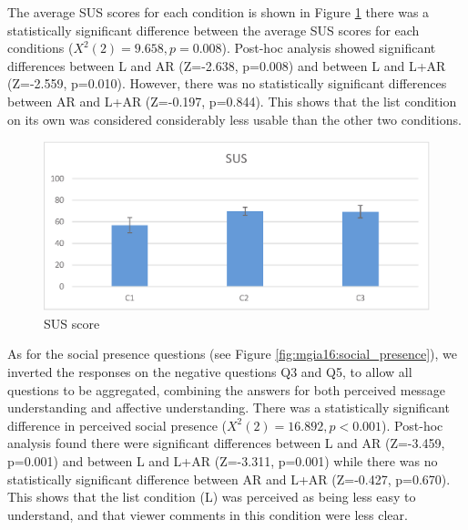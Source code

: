 The average SUS scores for each condition is shown in Figure \ref{fig:mgia16:questions_sus} there was a statistically significant difference between the average SUS scores for each conditions ($X^2(2)=9.658, p=0.008$). Post-hoc analysis showed significant differences between L and AR (Z=-2.638, p=0.008) and between L and L+AR (Z=-2.559, p=0.010). However, there was no statistically significant differences between AR and L+AR (Z=-0.197, p=0.844). This shows that the list condition on its own was considered considerably less usable than the other two conditions.


\begin{figure}[ht]
  \centering
  \includegraphics[width=.8\linewidth]{images/mgia16/sus.eps}
  \caption{SUS score}
  \label{fig:mgia16:questions_sus}
\end{figure}

As for the social presence questions (see Figure \ref{fig:mgia16:social_presence}), we inverted the responses on the negative questions Q3 and Q5, to allow all questions to be aggregated, combining the answers for both perceived message understanding and affective understanding. There was a statistically significant difference in perceived social presence ($X^2(2)=16.892, p<0.001$). Post-hoc analysis found there were significant differences between L and AR (Z=-3.459, p=0.001) and between L and L+AR (Z=-3.311, p=0.001) while there was no statistically significant difference between AR and L+AR (Z=-0.427, p=0.670). This shows that the list condition (L) was perceived as being less easy to understand, and that viewer comments in this condition were less clear.

